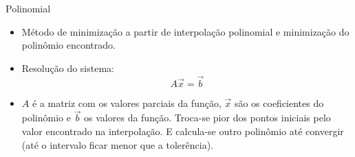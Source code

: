 \begin{frame}[t]{Polinomial}
\begin{itemize}
	\item Método de minimização a partir de interpolação polinomial e minimização do polinômio encontrado.
	\vspace{1mm}
	\item Resolução do sistema: \\
	\begin{equation}
		A\vec{x} =\vec{b}
	\end{equation}
	\item $A$ é a matriz com os valores parciais da função, $\vec{x}$ são os coeficientes do polinômio e $\vec{b}$ os valores da função. Troca-se pior dos pontos iniciais pelo valor encontrado na interpolação. E calcula-se outro polinômio até convergir (até o intervalo ficar menor que a tolerência).
	
\end{itemize}
\end{frame}
